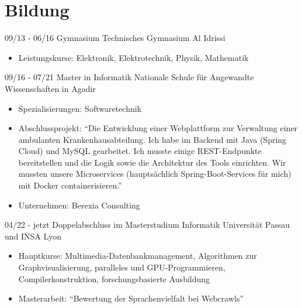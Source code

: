 \documentclass[oneside]{friggeri-cv}
\begin{document}
\section{Bildung}
\begin{entrylist}
  \entry
    {09/13 - 06/16}
    {Gymnasium}
    {Technisches Gymnasium Al Idrissi}
    {\begin{itemize}\vspace{-3mm}
	 	\item Leistungskurse: Elektronik, Elektrotechnik, Physik, Mathematik
	\end{itemize}}
  \entry
    {09/16 - 07/21}
    {Master in Informatik}
    {Nationale Schule für Angewandte Wissenschaften in Agadir}
    {\begin{itemize}\vspace{-3mm}
    	\item Spezialisierungen: Softwaretechnik    	
	\item Abschlussprojekt: \enquote{Die Entwicklung einer Webplattform zur Verwaltung einer ambulanten Krankenhausabteilung. Ich habe im Backend mit Java (Spring Cloud) und MySQL gearbeitet. Ich musste einige REST-Endpunkte bereitstellen und die Logik sowie die Architektur des Tools einrichten. Wir mussten unsere Microservices (hauptsächlich Spring-Boot-Services für mich) mit Docker containerisieren.}
    	\item Unternehmen: Berexia Consulting 
    \end{itemize}
	}
  \entry
    {04/22 - jetzt}
    {Doppelabschluss im Masterstudium Informatik}
    {Universität Passau und INSA Lyon}
    {\begin{itemize}\vspace{-3mm}
    	\item Hauptkurse: Multimedia-Datenbankmanagement, Algorithmen zur Graphvisualisierung, paralleles und GPU-Programmieren, Compilerkonstruktion, forschungsbasierte Ausbildung 
 
    	\item Masterarbeit: \enquote{Bewertung der Sprachenvielfalt bei Webcrawls}
    \end{itemize}
    }
\\
\end{entrylist}
\end{document}
